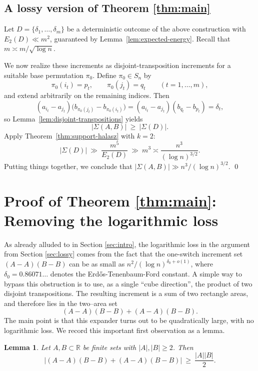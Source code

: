 \documentclass[12pt]{amsart}
\newtheorem{lemma}[theorem]{Lemma}
\theoremstyle{definition}
\theoremstyle{remark}
\newcommand{\RR}{\mathbb{R}}
\newcommand{\abs}[1]{\left|#1\right|}
\newcommand{\Sig}{\Sigma}
\begin{document}
\subsection*{A lossy version of Theorem \ref{thm:main}} \label{sec:lossy}

Let $D=\{\delta_1,\dots,\delta_m\}$ be a deterministic outcome of the above construction with
$E_2(D)\ll m^2$, guaranteed by Lemma~\ref{lem:expected-energy}. Recall that $m \asymp m / \sqrt{\log n}$. 

We now realize these increments as disjoint-transposition increments for a suitable base permutation $\pi_0$. Define $\pi_0\in S_n$ by
\[
\pi_0(i_t)=p_t,\qquad \pi_0(j_t)=q_t\qquad (t=1,\dots,m),
\]
and extend arbitrarily on the remaining indices. Then
\[
(a_{i_t}-a_{j_t})\bigl(b_{\pi_0(j_t)}-b_{\pi_0(i_t)}\bigr)
=(a_{i_t}-a_{j_t})(b_{q_t}-b_{p_t})=\delta_t,
\]
so Lemma~\ref{lem:disjoint-transpositions} yields
\[
\abs{\Sig(A,B)}\ \ge\ \abs{\Sig(D)}.
\]
Apply Theorem~\ref{thm:support-halasz} with $k=2$:
\[
\abs{\Sig(D)}\ \gg\ \frac{m^5}{E_2(D)}\ \gg\ m^3 \asymp \frac{n^{3}}{(\log n)^{3/2}}.
\]
Putting things together, we conclude that $|\Sigma(A,B)| \gg n^{3}/(\log n)^{3/2}$. \qed


\section{Proof of Theorem \ref{thm:main}: Removing the logarithmic loss} \label{sec:cubic}

As already alluded to in Section \ref{sec:intro}, the logarithmic loss in the argument from Section \ref{sec:lossy} comes from the fact that the one-switch increment
set $(A-A)(B-B)$ can be as small as $n^2/(\log n)^{\delta_0+o(1)}$, where $\delta_0 = 0.86071\ldots$ denotes the Erd\H{o}s-Tenenbaum-Ford constant. A simple way to
bypass this obstruction is to use, as a single ``cube direction'', the product of two disjoint
transpositions.  The resulting increment is a sum of two rectangle areas, and therefore lies
in the two--area set
\[
(A-A)(B-B)+(A-A)(B-B).
\]
The main point is that this expander turns out to be quadratically large, with no logarithmic loss. We record this important first observation as a lemma.

\begin{lemma}\label{lem:two-area-warmup}
Let $A,B\subset\RR$ be finite sets with $|A|,|B| \geq 2$. Then
\[
\bigl|(A-A)(B-B)+(A-A)(B-B)\bigr|\ \ge\ \frac{|A||B|}{2}.
\]
\end{lemma}
\end{document}
